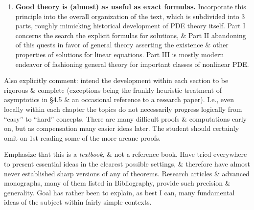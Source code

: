 \documentclass{article}
\begin{document}
\begin{enumerate}
\begin{enumerate}
		\item {\bf Good theory is (almost) as useful as exact formulas.} Incorporate this principle into the overall organization of the text, which is subdivided into 3 parts, roughly mimicking historical development of PDE theory itself. Part I concerns the search the explicit formulas for solutions, \& Part II abandoning of this quests in favor of general theory asserting the existence \& other properties of solutions for linear equations. Part III is mostly modern endeavor of fashioning general theory for important classes of nonlinear PDE.
	\end{enumerate}
	Also explicitly comment: intend the development within each section to be rigorous \& complete (exceptions being the frankly heuristic treatment of asymptotics in \S4.5 \& an occasional reference to a research paper). I.e., even locally within each chapter the topics do not necessarily progress logically from ``easy'' to ``hard'' concepts. There are many difficult proofs \& computations early on, but as compensation many easier ideas later. The student should certainly omit on 1st reading some of the more arcane proofs.
	
	Emphasize that this is a {\it textbook}, \& not a reference book. Have tried everywhere to present essential ideas in the clearest possible settings, \& therefore have almost never established sharp versions of any of theorems. Research articles \& advanced monographs, many of them listed in Bibliography, provide such precision \& generality. Goal has rather been to explain, as best I can, many fundamental ideas of the subject within fairly simple contexts.
	

\end{enumerate}
\end{document}
